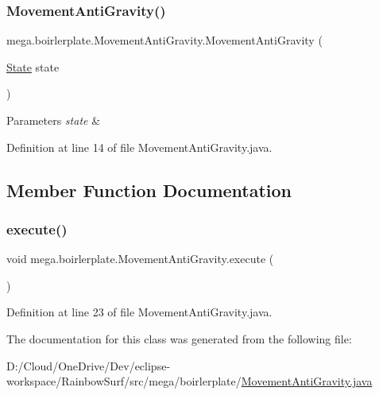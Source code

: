 \subsubsection{\texorpdfstring{Movement\+Anti\+Gravity()}{MovementAntiGravity()}}
{\footnotesize\ttfamily mega.\+boirlerplate.\+Movement\+Anti\+Gravity.\+Movement\+Anti\+Gravity (\begin{DoxyParamCaption}\item[{\hyperlink{classmega_1_1boirlerplate_1_1_state}{State}}]{state }\end{DoxyParamCaption})}


\begin{DoxyParams}{Parameters}
{\em state} & \\
\hline
\end{DoxyParams}


Definition at line 14 of file Movement\+Anti\+Gravity.\+java.



\subsection{Member Function Documentation}
\mbox{\label{classmega_1_1boirlerplate_1_1_movement_anti_gravity_af628cd2124407f6009e33108000f759d}} 
\subsubsection{\texorpdfstring{execute()}{execute()}}
{\footnotesize\ttfamily void mega.\+boirlerplate.\+Movement\+Anti\+Gravity.\+execute (\begin{DoxyParamCaption}{ }\end{DoxyParamCaption})}



Definition at line 23 of file Movement\+Anti\+Gravity.\+java.



The documentation for this class was generated from the following file\+:\begin{DoxyCompactItemize}
\item 
D\+:/\+Cloud/\+One\+Drive/\+Dev/eclipse-\/workspace/\+Rainbow\+Surf/src/mega/boirlerplate/\hyperlink{_movement_anti_gravity_8java}{Movement\+Anti\+Gravity.\+java}\end{DoxyCompactItemize}
